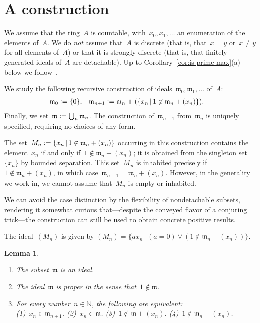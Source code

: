 \documentclass[com,11pt,crcready]{iosart2x}
\theoremstyle{definition}
\theoremstyle{plain}
\newtheorem{lemma}[definition]{Lemma}
\theoremstyle{remark}
\newcommand{\mmm}{\mathfrak{m}}
\newcommand{\NN}{\mathbb{N}}
\newcommand{\defeq}{\vcentcolon=}
\renewcommand{\_}{\mathpunct{.}\,}
\begin{document}
\section{A construction}
\label{sect:constr}

We assume that the ring~$A$ is countable, with~$x_0, x_1, \ldots$ an
enumeration of the elements of~$A$. We do \emph{not} assume that~$A$ is
discrete (that is, that~$x = y$ or~$x \neq y$ for all elements of~$A$) or that
it is strongly discrete (that is, that finitely generated
ideals of~$A$ are detachable). Up to Corollary~\ref{cor:is-prime-max}(a) below
we follow~\cite{berardi-valentini:krivine}.

We study the following recursive construction of ideals~$\mmm_0, \mmm_1,
\ldots$ of~$A$:
\begin{align*}
  \mmm_0 &\defeq \{0\}, &
  \mmm_{n+1} &\defeq \mmm_n + (\{ x_n \,|\, 1 \not\in \mmm_n + (x_n) \}).
\end{align*}
Finally, we set~$\mmm \defeq \bigcup_n \mmm_n$. The construction
of~$\mmm_{n+1}$ from~$\mmm_n$ is uniquely specified, requiring no choices of
any form.

The set~$M_n \defeq \{ x_n \,|\, 1 \not\in \mmm_n + (x_n) \}$ occurring in this
construction contains the element~$x_n$ if and only if~$1 \not\in \mmm_n +
(x_n)$; it is obtained from the singleton set~$\{x_n\}$ by bounded separation.
This set~$M_n$ is inhabited precisely if~$1 \not\in \mmm_n + (x_n)$, in which case~$\mmm_{n+1} = \mmm_n + (x_n)$.
However, in the generality we work in, we cannot assume that~$M_n$ is empty or
inhabited.

We can avoid the case distinction by the flexibility of nondetachable
subsets, rendering it somewhat curious that---despite the conveyed flavor of a
conjuring trick---the construction can still be used to obtain concrete
positive results.

The ideal~$(M_n)$ is given by
$(M_n) = \{ a x_n \,|\, (a = 0) \vee (1 \not\in \mmm_n + (x_n)) \}$.

\begin{lemma}\label{lemma:omnibus}
\begin{enumerate}
\item[\textnormal{(a)}] The subset~$\mmm$ is an ideal.
\item[\textnormal{(b)}] The ideal~$\mmm$ is \emph{proper} in the sense that~$1 \not\in \mmm$.
\item[\textnormal{(c)}] For every number~$n \in \NN$, the following are equivalent: \\
(1)~$x_n \in \mmm_{n+1}$.\quad
(2)~$x_n \in \mmm$.\quad
(3)~$1 \not\in \mmm + (x_n)$.\quad
(4)~$1 \not\in \mmm_n + (x_n)$.
\end{enumerate}
\end{lemma}
\end{document}
